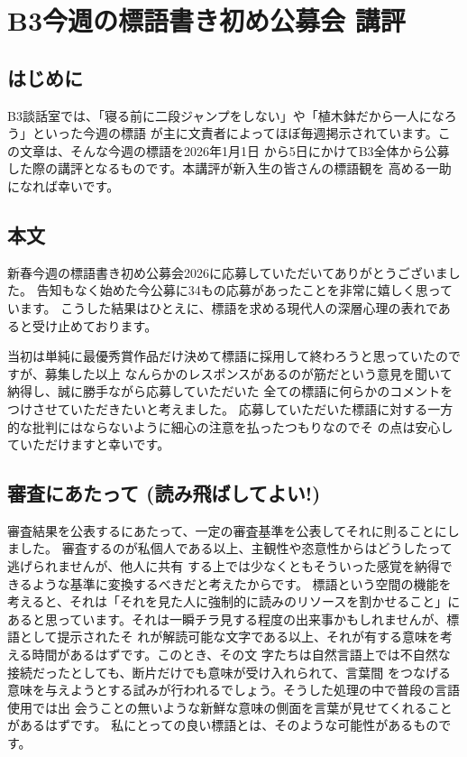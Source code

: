 \section{B3今週の標語書き初め公募会 講評}

\subsection{はじめに}
B3談話室では、「寝る前に二段ジャンプをしない」や「植木鉢だから一人になろう」といった今週の標語
が主に文責者によってほぼ毎週掲示されています。この文章は、そんな今週の標語を2026年1月1日
から5日にかけてB3全体から公募した際の講評となるものです。本講評が新入生の皆さんの標語観を
高める一助になれば幸いです。

\subsection{本文}
新春今週の標語書き初め公募会2026に応募していただいてありがとうございました。
告知もなく始めた今公募に34もの応募があったことを非常に嬉しく思っています。
こうした結果はひとえに、標語を求める現代人の深層心理の表れであると受け止めております。

当初は単純に最優秀賞作品だけ決めて標語に採用して終わろうと思っていたのですが、募集した以上
なんらかのレスポンスがあるのが筋だという意見を聞いて納得し、誠に勝手ながら応募していただいた
全ての標語に何らかのコメントをつけさせていただきたいと考えました。
応募していただいた標語に対する一方的な批判にはならないように細心の注意を払ったつもりなのでそ
の点は安心していただけますと幸いです。

\subsection{審査にあたって (読み飛ばしてよい!)}
審査結果を公表するにあたって、一定の審査基準を公表してそれに則ることにしました。
審査するのが私個人である以上、主観性や恣意性からはどうしたって逃げられませんが、他人に共有
する上では少なくともそういった感覚を納得できるような基準に変換するべきだと考えたからです。
標語という空間の機能を考えると、それは「それを見た人に強制的に読みのリソースを割かせること」に
あると思っています。それは一瞬チラ見する程度の出来事かもしれませんが、標語として提示されたそ
れが解読可能な文字である以上、それが有する意味を考える時間があるはずです。このとき、その文
字たちは自然言語上では不自然な接続だったとしても、断片だけでも意味が受け入れられて、言葉間
をつなげる意味を与えようとする試みが行われるでしょう。そうした処理の中で普段の言語使用では出
会うことの無いような新鮮な意味の側面を言葉が見せてくれることがあるはずです。
私にとっての良い標語とは、そのような可能性があるものです。

